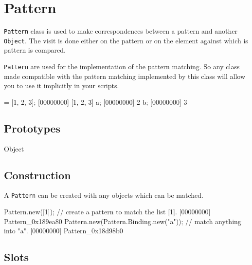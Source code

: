 \section{Pattern}

\lstinline|Pattern| class is used to make correspondences between a pattern
and another \lstinline|Object|.  The visit is done either on the pattern or
on the element against which is pattern is compared.

\lstinline|Pattern| are used for the implementation of the pattern matching.
So any class made compatible with the pattern matching implemented by this
class will allow you to use it implicitly in your scripts.

\begin{urbiscript} = [1, 2, 3];
[00000000] [1, 2, 3]
a;
[00000000] 2
b;
[00000000] 3
\end{urbiscript}

\subsection{Prototypes}

\begin{refObjects}
\item[Object]
\end{refObjects}

\subsection{Construction}

A \lstinline|Pattern| can be created with any objects which can be matched.

\begin{urbiscript}
Pattern.new([1]); // create a pattern to match the list [1].
[00000000] Pattern_0x189ea80
Pattern.new(Pattern.Binding.new("a")); // match anything into "a".
[00000000] Pattern_0x18d98b0
\end{urbiscript}

\subsection{Slots}

